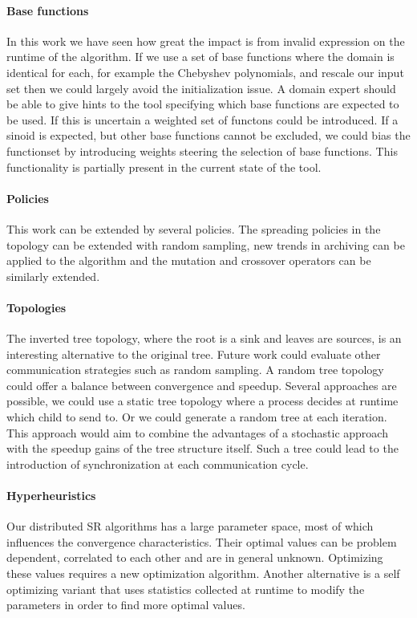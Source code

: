 \paragraph{Base functions}
In this work we have seen how great the impact is from invalid expression on the runtime of the algorithm. If we use a set of base functions where the domain is identical for each, for example the Chebyshev polynomials, and rescale our input set then we could largely avoid the initialization issue.
A domain expert should be able to give hints to the tool specifying which base functions are expected to be used. If this is uncertain a weighted set of functons could be introduced. If a sinoid is expected, but other base functions cannot be excluded, we could bias the functionset by introducing weights steering the selection of base functions. This functionality is partially present in the current state of the tool.

\paragraph{Policies}
This work can be extended by several policies. The spreading policies in the topology can be extended with random sampling, new trends in archiving can be applied to the algorithm and the mutation and crossover operators can be similarly extended. 

\paragraph{Topologies}
The inverted tree topology, where the root is a sink and leaves are sources, is an interesting alternative to the original tree. Future work could evaluate other communication strategies such as random sampling. A random tree topology could offer a balance between convergence and speedup. Several approaches are possible, we could use a static tree topology where a process decides at runtime which child to send to. Or we could generate a random tree at each iteration. This approach would aim to combine the advantages of a stochastic approach with the speedup gains of the tree structure itself. Such a tree could lead to the introduction of synchronization at each communication cycle.

\paragraph{Hyperheuristics}
Our distributed SR algorithms has a large parameter space, most of which influences the convergence characteristics. Their optimal values can be problem dependent, correlated to each other and are in general unknown. Optimizing these values requires a new optimization algorithm. Another alternative is a self optimizing variant that uses statistics collected at runtime to modify the parameters in order to find more optimal values.

